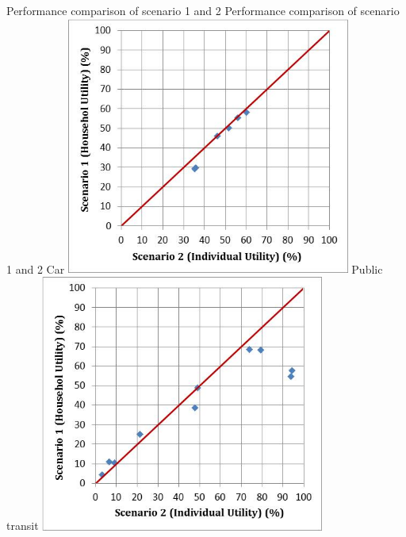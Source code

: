 \createfigure%
{Performance comparison of scenario 1 and 2}%
{Performance comparison of scenario 1 and 2}%
{\label{fig:baoding_fig2}}%
{%
  \createsubfigure%
  {Car}%
  {\includegraphics[width=0.7\textwidth,angle=0]{scenarios/figures/baoding_fig2a.png}}%
  {\label{fig:baoding_fig2a}}%
  {}%
  \createsubfigure%
  {Public transit}%
	{\includegraphics[width=0.7\textwidth,angle=0]{scenarios/figures/baoding_fig2b.png}}%
  {\label{fig:baoding_fig2b}}%
  {}%
}%
{}

